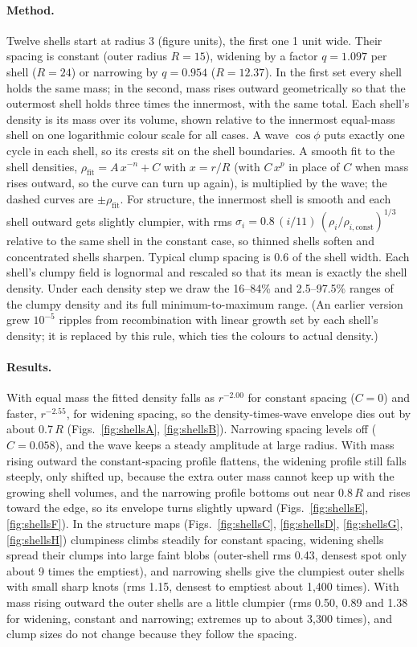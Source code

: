 \documentclass[aps,prd,twocolumn,nofootinbib,superscriptaddress,floatfix]{revtex4-2}
\begin{document}
\paragraph*{Method.} Twelve shells start at radius 3 (figure units), the first one 1 unit wide. Their spacing is constant (outer radius $R=15$), widening by a factor $q=1.097$ per shell ($R=24$) or narrowing by $q=0.954$ ($R=12.37$). In the first set every shell holds the same mass; in the second, mass rises outward geometrically so that the outermost shell holds three times the innermost, with the same total. Each shell's density is its mass over its volume, shown relative to the innermost equal-mass shell on one logarithmic colour scale for all cases. A wave $\cos\phi$ puts exactly one cycle in each shell, so its crests sit on the shell boundaries. A smooth fit to the shell densities, $\rho_\mathrm{fit}=A\,x^{-n}+C$ with $x=r/R$ (with $C\,x^{p}$ in place of $C$ when mass rises outward, so the curve can turn up again), is multiplied by the wave; the dashed curves are $\pm\rho_\mathrm{fit}$. For structure, the innermost shell is smooth and each shell outward gets slightly clumpier, with rms $\sigma_i=0.8\,(i/11)\,(\rho_i/\rho_{i,\mathrm{const}})^{1/3}$ relative to the same shell in the constant case, so thinned shells soften and concentrated shells sharpen. Typical clump spacing is 0.6 of the shell width. Each shell's clumpy field is lognormal and rescaled so that its mean is exactly the shell density. Under each density step we draw the 16--84\% and 2.5--97.5\% ranges of the clumpy density and its full minimum-to-maximum range. (An earlier version grew $10^{-5}$ ripples from recombination with linear growth set by each shell's density; it is replaced by this rule, which ties the colours to actual density.)

\paragraph*{Results.} With equal mass the fitted density falls as $r^{-2.00}$ for constant spacing ($C=0$) and faster, $r^{-2.55}$, for widening spacing, so the density-times-wave envelope dies out by about 0.7\,$R$ (Figs.~\ref{fig:shellsA}, \ref{fig:shellsB}). Narrowing spacing levels off ($C=0.058$), and the wave keeps a steady amplitude at large radius. With mass rising outward the constant-spacing profile flattens, the widening profile still falls steeply, only shifted up, because the extra outer mass cannot keep up with the growing shell volumes, and the narrowing profile bottoms out near 0.8\,$R$ and rises toward the edge, so its envelope turns slightly upward (Figs.~\ref{fig:shellsE}, \ref{fig:shellsF}). In the structure maps (Figs.~\ref{fig:shellsC}, \ref{fig:shellsD}, \ref{fig:shellsG}, \ref{fig:shellsH}) clumpiness climbs steadily for constant spacing, widening shells spread their clumps into large faint blobs (outer-shell rms 0.43, densest spot only about 9 times the emptiest), and narrowing shells give the clumpiest outer shells with small sharp knots (rms 1.15, densest to emptiest about 1,400 times). With mass rising outward the outer shells are a little clumpier (rms 0.50, 0.89 and 1.38 for widening, constant and narrowing; extremes up to about 3,300 times), and clump sizes do not change because they follow the spacing.
\end{document}
